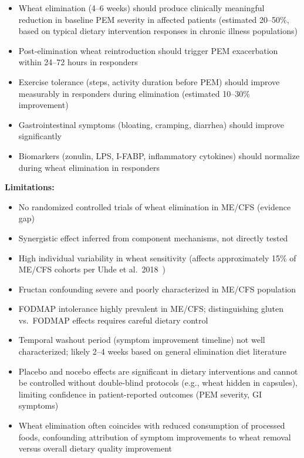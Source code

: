 \begin{speculation}
\begin{itemize}
    \item Wheat elimination (4--6 weeks) should produce clinically meaningful reduction in baseline PEM severity in affected patients (estimated 20--50\%, based on typical dietary intervention responses in chronic illness populations)
    \item Post-elimination wheat reintroduction should trigger PEM exacerbation within 24--72 hours in responders
    \item Exercise tolerance (steps, activity duration before PEM) should improve measurably in responders during elimination (estimated 10--30\% improvement)
    \item Gastrointestinal symptoms (bloating, cramping, diarrhea) should improve significantly
    \item Biomarkers (zonulin, LPS, I-FABP, inflammatory cytokines) should normalize during wheat elimination in responders
\end{itemize}

\textbf{Limitations:}

\begin{itemize}
    \item No randomized controlled trials of wheat elimination in ME/CFS (evidence gap)
    \item Synergistic effect inferred from component mechanisms, not directly tested
    \item High individual variability in wheat sensitivity (affects approximately 15\% of ME/CFS cohorts per Uhde et al.\ 2018~\cite{Uhde2018})
    \item Fructan confounding severe and poorly characterized in ME/CFS population
    \item FODMAP intolerance highly prevalent in ME/CFS; distinguishing gluten vs.\ FODMAP effects requires careful dietary control
    \item Temporal washout period (symptom improvement timeline) not well characterized; likely 2--4 weeks based on general elimination diet literature
    \item Placebo and nocebo effects are significant in dietary interventions and cannot be controlled without double-blind protocols (e.g., wheat hidden in capsules), limiting confidence in patient-reported outcomes (PEM severity, GI symptoms)
    \item Wheat elimination often coincides with reduced consumption of processed foods, confounding attribution of symptom improvements to wheat removal versus overall dietary quality improvement
\end{itemize}


\end{speculation}
